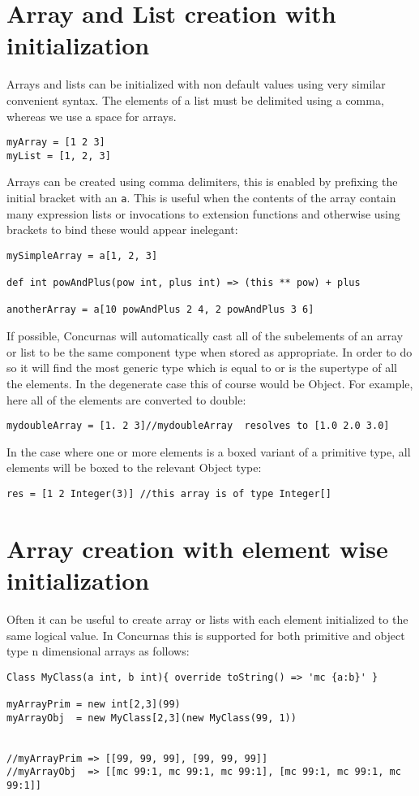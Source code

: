 \documentclass[conc-doc]{subfiles}
\begin{document}
\section{Array and List creation with initialization}
Arrays and lists can be initialized with non default values using very similar convenient syntax. The elements of a list must be delimited using a comma, whereas we use a space for arrays.
\begin{lstlisting}
myArray = [1 2 3]
myList = [1, 2, 3]
\end{lstlisting}

Arrays can be created using comma delimiters, this is enabled by prefixing the initial bracket with an \lstinline{a}. This is useful when the contents of the array contain many expression lists or invocations to extension functions and otherwise using brackets to bind these would appear inelegant:
\begin{lstlisting}
mySimpleArray = a[1, 2, 3]

def int powAndPlus(pow int, plus int) => (this ** pow) + plus

anotherArray = a[10 powAndPlus 2 4, 2 powAndPlus 3 6]
\end{lstlisting}

If possible, Concurnas will automatically cast all of the subelements of an array or list to be the same component type when stored as appropriate. In order to do so it will find the most generic type which is equal to or is the supertype of all the elements. In the degenerate case this of course would be Object. For example, here all of the elements are converted to double:

\begin{lstlisting}
mydoubleArray = [1. 2 3]//mydoubleArray  resolves to [1.0 2.0 3.0]
\end{lstlisting}

In the case where one or more elements is a boxed variant of a primitive type, all elements will be boxed to the relevant Object type:
\begin{lstlisting}
res = [1 2 Integer(3)] //this array is of type Integer[]
\end{lstlisting}

\section{Array creation with element wise initialization}
Often it can be useful to create array or lists with each element initialized to the same logical value. In Concurnas this is supported for both primitive and object type n dimensional arrays as follows:
\begin{lstlisting}
Class MyClass(a int, b int){ override toString() => 'mc {a:b}' }

myArrayPrim = new int[2,3](99)
myArrayObj  = new MyClass[2,3](new MyClass(99, 1))


//myArrayPrim => [[99, 99, 99], [99, 99, 99]]
//myArrayObj  => [[mc 99:1, mc 99:1, mc 99:1], [mc 99:1, mc 99:1, mc 99:1]]
\end{lstlisting}
\end{document}
